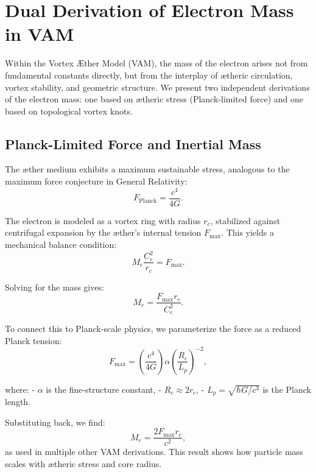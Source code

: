 \section{Dual Derivation of Electron Mass in VAM}
\label{appendix:mass-derivation}

Within the Vortex Æther Model (VAM), the mass of the electron arises not from fundamental constants directly, but from the interplay of ætheric circulation, vortex stability, and geometric structure. We present two independent derivations of the electron mass: one based on ætheric stress (Planck-limited force) and one based on topological vortex knots.

\subsection*{Planck-Limited Force and Inertial Mass}
\label{sec:mass-force-balance}

The æther medium exhibits a maximum sustainable stress, analogous to the maximum force conjecture in General Relativity:
\begin{equation*}
    F_{\text{Planck}} = \frac{c^4}{4G}.
\end{equation*}

The electron is modeled as a vortex ring with radius \( r_c \), stabilized against centrifugal expansion by the æther's internal tension \( F_{\text{max}} \). This yields a mechanical balance condition:
\begin{equation*}
    M_e \frac{C_e^2}{r_c} = F_{\text{max}}.
\end{equation*}

Solving for the mass gives:
\begin{equation*}
    M_e = \frac{F_{\text{max}} r_c}{C_e^2}.
\end{equation*}

To connect this to Planck-scale physics, we parameterize the force as a reduced Planck tension:
\begin{equation*}
    F_{\text{max}} = \left( \frac{c^4}{4G} \right) \alpha \left( \frac{R_c}{L_p} \right)^{-2},
\end{equation*}

where:
- \( \alpha \) is the fine-structure constant,
- \( R_c \approx 2 r_c \),
- \( L_p = \sqrt{\hbar G / c^3} \) is the Planck length.

Substituting back, we find:
\begin{equation}
    M_e = \frac{2 F_{\text{max}} r_c}{c^2},
\end{equation}
as used in multiple other VAM derivations. This result shows how particle mass scales with ætheric stress and core radius.

